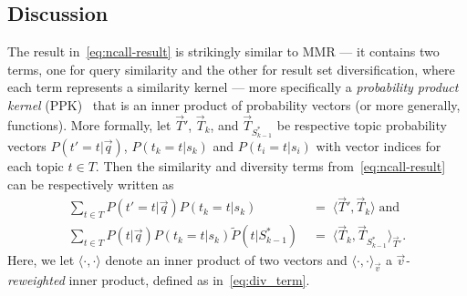 \subsection{Discussion}

The result in~\eqref{eq:ncall-result} is strikingly similar to MMR --- it
contains two terms, one for query similarity and the other for result
set diversification, where each term represents a similarity kernel
--- more specifically a \emph{probability product kernel}
(PPK)~\cite{prodprobkernel} that is an inner product of probability
vectors (or more generally, functions).  More formally, let
$\vec{T}'$, $\vec{T}_k$, and $\vec{T}_{S_{k-1}^*}$ be respective topic
probability vectors $P(t'=t|\vec{q})$, $P(t_k=t|s_k)$ and
$P(t_i\!=\!t|s_i)$
with vector indices for each topic $t
\in T$.  Then the similarity and diversity terms from~\eqref{eq:ncall-result}
can be respectively written as
\begin{align}
\sum_{t \in T} P(t'=t|\vec{q}) P(t_k=t|s_{k}) & \; = \; \langle \vec{T}',\vec{T}_k \rangle \label{eq:sim_term} \; \mbox{and}\\
\sum_{t \in T} P(t|\vec{q}) P(t_k=t|s_k) \tilde{P}(t | S_{k-1}^*) & \; = \; \langle \vec{T}_k, \vec{T}_{S_{k-1}^*} \rangle_{\vec{T}'}. \label{eq:div_term}
\end{align}
Here, we let $\langle \cdot,\cdot \rangle$ denote an inner product of
two vectors and $\langle \cdot,\cdot \rangle_\vec{v}$ a
\emph{$\vec{v}$-reweighted} inner product, defined as
in~\eqref{eq:div_term}.

